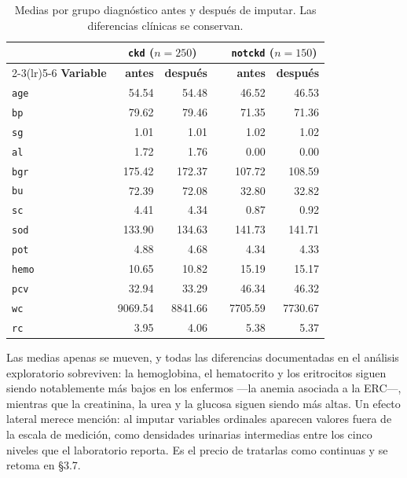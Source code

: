 \documentclass[11pt, a4paper]{article}
\begin{document}
\begin{table}[H]
\centering
\caption{Medias por grupo diagnóstico antes y después de imputar. Las diferencias clínicas se
conservan.}
\label{tab:imputacion}
\small
\renewcommand{\arraystretch}{1.1}
\begin{tabular}{l r r c r r}
\toprule
& \multicolumn{2}{c}{\textbf{\texttt{ckd}} ($n=250$)} & &
  \multicolumn{2}{c}{\textbf{\texttt{notckd}} ($n=150$)} \\
\cmidrule(lr){2-3}\cmidrule(lr){5-6}
\textbf{Variable} & \textbf{antes} & \textbf{después} & & \textbf{antes} & \textbf{después} \\
\midrule
\texttt{age}  &   54.54 &   54.48 & &   46.52 &   46.53 \\
\texttt{bp}   &   79.62 &   79.46 & &   71.35 &   71.36 \\
\texttt{sg}   &    1.01 &    1.01 & &    1.02 &    1.02 \\
\texttt{al}   &    1.72 &    1.76 & &    0.00 &    0.00 \\
\texttt{bgr}  &  175.42 &  172.37 & &  107.72 &  108.59 \\
\texttt{bu}   &   72.39 &   72.08 & &   32.80 &   32.82 \\
\texttt{sc}   &    4.41 &    4.34 & &    0.87 &    0.92 \\
\texttt{sod}  &  133.90 &  134.63 & &  141.73 &  141.71 \\
\texttt{pot}  &    4.88 &    4.68 & &    4.34 &    4.33 \\
\texttt{hemo} &   10.65 &   10.82 & &   15.19 &   15.17 \\
\texttt{pcv}  &   32.94 &   33.29 & &   46.34 &   46.32 \\
\texttt{wc}   & 9069.54 & 8841.66 & & 7705.59 & 7730.67 \\
\texttt{rc}   &    3.95 &    4.06 & &    5.38 &    5.37 \\
\bottomrule
\end{tabular}
\end{table}

Las medias apenas se mueven, y todas las diferencias documentadas en el análisis exploratorio
sobreviven: la hemoglobina, el hematocrito y los eritrocitos siguen siendo notablemente más bajos
en los enfermos —la anemia asociada a la ERC—, mientras que la creatinina, la urea y la glucosa
siguen siendo más altas. Un efecto lateral merece mención: al imputar variables ordinales aparecen
valores fuera de la escala de medición, como densidades urinarias intermedias entre los cinco
niveles que el laboratorio reporta. Es el precio de tratarlas como continuas y se retoma en \S3.7.
\end{document}
